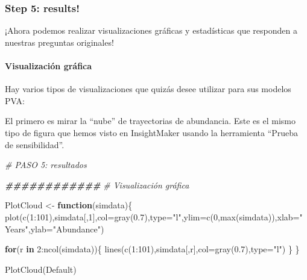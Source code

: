 \documentclass[
]{article}
\newenvironment{Shaded}{\begin{snugshade}}{\end{snugshade}}
\newcommand{\AttributeTok}[1]{\textcolor[rgb]{0.77,0.63,0.00}{#1}}
\newcommand{\CommentTok}[1]{\textcolor[rgb]{0.56,0.35,0.01}{\textit{#1}}}
\newcommand{\ControlFlowTok}[1]{\textcolor[rgb]{0.13,0.29,0.53}{\textbf{#1}}}
\newcommand{\DecValTok}[1]{\textcolor[rgb]{0.00,0.00,0.81}{#1}}
\newcommand{\DocumentationTok}[1]{\textcolor[rgb]{0.56,0.35,0.01}{\textbf{\textit{#1}}}}
\newcommand{\FloatTok}[1]{\textcolor[rgb]{0.00,0.00,0.81}{#1}}
\newcommand{\FunctionTok}[1]{\textcolor[rgb]{0.00,0.00,0.00}{#1}}
\newcommand{\NormalTok}[1]{#1}
\newcommand{\OtherTok}[1]{\textcolor[rgb]{0.56,0.35,0.01}{#1}}
\newcommand{\SpecialCharTok}[1]{\textcolor[rgb]{0.00,0.00,0.00}{#1}}
\newcommand{\StringTok}[1]{\textcolor[rgb]{0.31,0.60,0.02}{#1}}
\begin{document}
\hypertarget{step-5-results}{%
\subsubsection{Step 5: results!}\label{step-5-results}}

¡Ahora podemos realizar visualizaciones gráficas y estadísticas que
responden a nuestras preguntas originales!

\hypertarget{visualizaciuxf3n-gruxe1fica}{%
\paragraph{Visualización gráfica}\label{visualizaciuxf3n-gruxe1fica}}

Hay varios tipos de visualizaciones que quizás desee utilizar para sus
modelos PVA:

El primero es mirar la ``nube'' de trayectorias de abundancia. Este es
el mismo tipo de figura que hemos visto en InsightMaker usando la
herramienta ``Prueba de sensibilidad''.

\begin{Shaded}
\begin{Highlighting}[]
\CommentTok{\# PASO 5: resultados}

\DocumentationTok{\#\#\#\#\#\#\#\#\#\#\#\#}
\CommentTok{\# Visualización gráfica}

\NormalTok{PlotCloud }\OtherTok{\textless{}{-}} \ControlFlowTok{function}\NormalTok{(simdata)\{}
  \FunctionTok{plot}\NormalTok{(}\FunctionTok{c}\NormalTok{(}\DecValTok{1}\SpecialCharTok{:}\DecValTok{101}\NormalTok{),simdata[,}\DecValTok{1}\NormalTok{],}\AttributeTok{col=}\FunctionTok{gray}\NormalTok{(}\FloatTok{0.7}\NormalTok{),}\AttributeTok{type=}\StringTok{"l"}\NormalTok{,}\AttributeTok{ylim=}\FunctionTok{c}\NormalTok{(}\DecValTok{0}\NormalTok{,}\FunctionTok{max}\NormalTok{(simdata)),}\AttributeTok{xlab=}\StringTok{"Years"}\NormalTok{,}\AttributeTok{ylab=}\StringTok{"Abundance"}\NormalTok{)}
  
  \ControlFlowTok{for}\NormalTok{(r }\ControlFlowTok{in} \DecValTok{2}\SpecialCharTok{:}\FunctionTok{ncol}\NormalTok{(simdata))\{}
    \FunctionTok{lines}\NormalTok{(}\FunctionTok{c}\NormalTok{(}\DecValTok{1}\SpecialCharTok{:}\DecValTok{101}\NormalTok{),simdata[,r],}\AttributeTok{col=}\FunctionTok{gray}\NormalTok{(}\FloatTok{0.7}\NormalTok{),}\AttributeTok{type=}\StringTok{"l"}\NormalTok{)}
\NormalTok{  \}}
\NormalTok{\}}

\FunctionTok{PlotCloud}\NormalTok{(Default)}
\end{Highlighting}
\end{Shaded}
\end{document}
